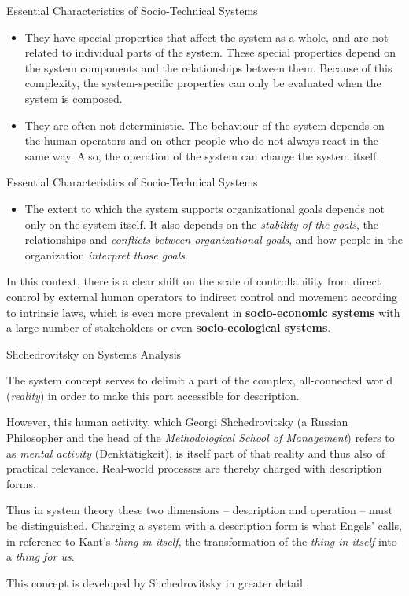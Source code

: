 \documentclass{beamer}
\begin{document}
\begin{frame}{Essential Characteristics of Socio-Technical Systems}
\begin{itemize}
\item They have special properties that affect the system as a whole, and are
  not related to individual parts of the system. These special properties
  depend on the system components and the relationships between them. Because
  of this complexity, the system-specific properties can only be evaluated
  when the system is composed.\medskip
\item They are often not deterministic. The behaviour of the system depends on
  the human operators and on other people who do not always react in the same
  way. Also, the operation of the system can change the system itself.
\end{itemize}
\end{frame}

\begin{frame}{Essential Characteristics of Socio-Technical Systems}
\begin{itemize}
\item The extent to which the system supports organizational goals depends not
  only on the system itself. It also depends on the \emph{stability of the
    goals}, the relationships and \emph{conflicts between organizational
    goals}, and how people in the organization \emph{interpret those goals}.
\end{itemize}

\begin{block}{}
  In this context, there is a clear shift on the scale of controllability from
  direct control by external human operators to indirect control and movement
  according to intrinsic laws, which is even more prevalent in
  \textbf{socio-economic systems} with a large number of stakeholders or even
  \textbf{socio-ecological systems}.
\end{block}
\end{frame}

\begin{frame}{Shchedrovitsky on Systems Analysis}
  
  The system concept serves to delimit a part of the complex, all-connected
  world (\emph{reality}) in order to make this part accessible for
  description.

However, this human activity, which Georgi Shchedrovitsky (a Russian
Philosopher and the head of the \emph{Methodological School of Management})
refers to as \emph{mental activity} (Denktätigkeit), is itself part of that
reality and thus also of practical relevance. Real-world processes are thereby
charged with description forms.

Thus in system theory these two dimensions -- description and operation --
must be distinguished. Charging a system with a description form is what
Engels' calls, in reference to Kant's \emph{thing in itself}, the
transformation of the \emph{thing in itself} into a \emph{thing for us}.

This concept is developed by Shchedrovitsky in greater detail.
\end{frame}
\end{document}

